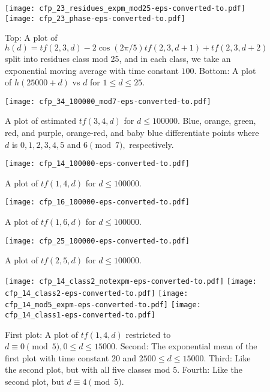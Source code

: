\documentclass[11pt]{amsart} %
\begin{document}
\begin{figure}[htbp]
\centering
\texttt{[image: cfp\_23\_residues\_expm\_mod25-eps-converted-to.pdf]}
\texttt{[image: cfp\_23\_phase-eps-converted-to.pdf]}
\caption{Top: A plot of $h(d) = tf(2,3,d) -  2 \cos(2 \pi / 5) tf(2,3,d+1) + tf(2, 3, d+2)$ split into residues class $\text{mod}$ 25, and in each class, we take an exponential moving average with time constant $100.$ Bottom: A plot of $h(25000+d)$ vs $d$ for $1 \le d \le 25.$
}
\label{fig:tf23d-res3}
\end{figure}


\begin{figure}[htbp]
	\centering
    \texttt{[image: cfp\_34\_100000\_mod7-eps-converted-to.pdf]}
    \caption{A plot of estimated $tf(3,4,d)$ for $d \leq 100000.$ Blue, orange, green, red, and purple, orange-red, and baby blue differentiate points where $d$ is $0, 1, 2, 3, 4, 5$ and $6 \pmod{7},$ respectively. 
    }
    \label{fig:tf34d-est}
\end{figure}

\begin{figure}[htbp]
	\centering
    \texttt{[image: cfp\_14\_100000-eps-converted-to.pdf]}
    \caption{A plot of  $tf(1,4,d)$ for $d \leq 100000.$
    }
    \label{fig:tf14d-est}
\end{figure}

\begin{figure}[htbp]
	\centering
    \texttt{[image: cfp\_16\_100000-eps-converted-to.pdf]}
    \caption{A plot of  $tf(1,6,d)$ for $d \leq 100000.$
    }
    \label{fig:tf16d-est}
\end{figure}

\begin{figure}[htbp]
	\centering
    \texttt{[image: cfp\_25\_100000-eps-converted-to.pdf]}
    \caption{A plot of $tf(2,5,d)$ for $d \leq 100000.$
    }
    \label{fig:tf25d-est}
\end{figure}

\begin{figure}[htbp]
\centering
\texttt{[image: cfp\_14\_class2\_notexpm-eps-converted-to.pdf]}
\texttt{[image: cfp\_14\_class2-eps-converted-to.pdf]}
\texttt{[image: cfp\_14\_mod5\_expm-eps-converted-to.pdf]}
\texttt{[image: cfp\_14\_class1-eps-converted-to.pdf]}
\caption{First plot: A plot of $tf(1,4,d)$ restricted to $d \equiv 0 \pmod{5}, 0 \le d \le 15000.$ Second: The exponential mean of the first plot with time constant 20 and $2500 \le d \le 15000.$ Third: Like the second plot, but with all five classes $\text{mod}$ $5$. Fourth: Like the second plot, but $d \equiv 4 \pmod{5}.$
}
\label{fig:tf14d-est2}
\end{figure}
\end{document}
